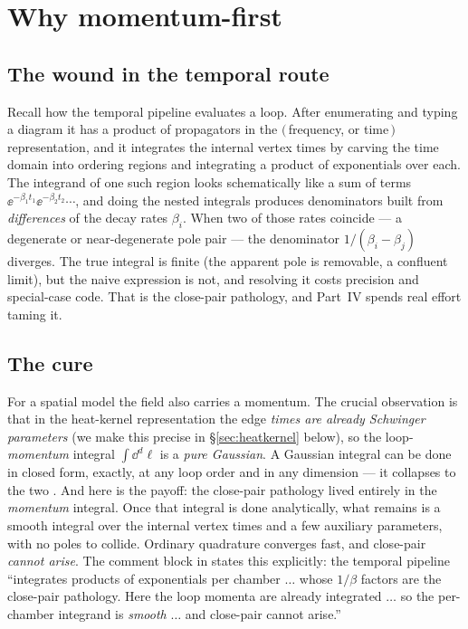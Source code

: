 \section{Why momentum-first}

\subsection{The wound in the temporal route}

Recall how the temporal pipeline evaluates a loop. After enumerating and typing a
diagram it has a product of propagators in the $(\,$frequency, or time$\,)$
representation, and it integrates the internal vertex times by carving the time
domain into ordering regions and integrating a product of exponentials over each.
The integrand of one such region looks schematically like a sum of terms
$\ee^{-\beta_1 t_1}\ee^{-\beta_2 t_2}\cdots$, and doing the nested integrals
produces denominators built from \emph{differences} of the decay rates $\beta_i$.
When two of those rates coincide --- a degenerate or near-degenerate pole pair ---
the denominator $1/(\beta_i-\beta_j)$ diverges. The true integral is finite (the
apparent pole is removable, a confluent limit), but the naive expression is not,
and resolving it costs precision and special-case code. That is the close-pair
pathology, and Part~IV spends real effort taming it.

\subsection{The cure}

For a spatial model the field also carries a momentum. The crucial observation is
that in the heat-kernel representation the edge \emph{times are already Schwinger
parameters} (we make this precise in \S\ref{sec:heatkernel} below), so the
loop-\emph{momentum} integral $\int \dd^d\ell$ is a \emph{pure Gaussian}. A
Gaussian integral can be done in closed form, exactly, at any loop order and in
any dimension --- it collapses to the two . And here is
the payoff: the close-pair pathology lived entirely in the \emph{momentum}
integral. Once that integral is done analytically, what remains is a smooth
integral over the internal vertex times and a few auxiliary parameters, with no
poles to collide. Ordinary quadrature converges fast, and close-pair
\emph{cannot arise}. The comment block in  states
this explicitly: the temporal pipeline ``integrates products of exponentials per
chamber $\dots$ whose $1/\beta$ factors are the close-pair pathology. Here the
loop momenta are already integrated $\dots$ so the per-chamber integrand is
\emph{smooth} $\dots$ and close-pair cannot arise.''

